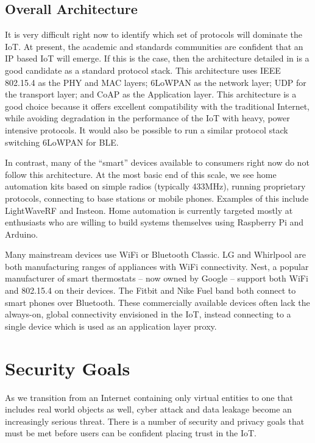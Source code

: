 \documentclass[10pt,journal,compsoc]{IEEEtran}
\begin{document}
\subsection{Overall Architecture}
It is very difficult right now to identify which set of protocols will dominate
the IoT. At present, the academic and standards communities are confident that
an IP based IoT will emerge. If this is the case, then the architecture
detailed in \cite{Palattella2013} is a good candidate as a standard protocol
stack. This architecture uses IEEE 802.15.4 as the PHY and MAC layers; 6LoWPAN
as the network layer; UDP for the transport layer; and CoAP as the Application
layer. This architecture is a good choice because it offers excellent
compatibility with the traditional Internet, while avoiding degradation in the
performance of the IoT with heavy, power intensive protocols. It would also be
possible to run a similar protocol stack switching 6LoWPAN for BLE. 

In contrast, many of the ``smart'' devices available to consumers right now do
not follow this architecture. At the most basic end of this scale, we see home
automation kits based on simple radios (typically 433MHz), running proprietary
protocols, connecting to base stations or mobile phones. Examples of this
include LightWaveRF and Insteon. Home automation is currently targeted mostly
at enthusiasts who are willing to build systems themselves using Raspberry Pi
and Arduino.  

Many mainstream devices use WiFi or Bluetooth Classic. LG and Whirlpool are
both manufacturing ranges of appliances with WiFi connectivity. Nest, a popular
manufacturer of smart thermostats -- now owned by Google -- support both WiFi
and 802.15.4 on their devices. The Fitbit and Nike Fuel band both connect to
smart phones over Bluetooth. These commercially available devices often lack
the always-on, global connectivity envisioned in the IoT, instead connecting
to a single device which is used as an application layer proxy.


\section{Security Goals}
As we transition from an Internet containing only virtual entities to one that
includes real world objects as well, cyber attack and data leakage become an
increasingly serious threat. There is a number of security and privacy goals that
must be met before users can be confident placing trust in the IoT.
\end{document}
